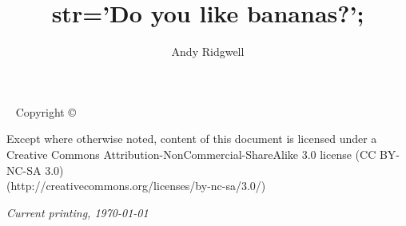 \documentclass{tufte-book} %
\title{str='Do you like bananas?';} %
\author{Andy Ridgwell} %
\begin{document}
\frontmatter


\maketitle %


\newpage
\begin{fullwidth}
~\vfill
\thispagestyle{empty}
\setlength{\parindent}{0pt}
\setlength{\parskip}{\baselineskip}
Copyright \copyright\ \the\year\ \thanklessauthor

\par{}

\par Except where otherwise noted, content of this document is licensed under a 
\\Creative Commons Attribution-NonCommercial-ShareAlike 3.0 license (CC BY-NC-SA 3.0) 
\\(http://creativecommons.org/licenses/by-nc-sa/3.0/)

\par\textit{Current printing, \today}
\end{fullwidth}


\tableofcontents %

\setcounter{chapter}{0}%


\listoffigures %


\listoftables %

\end{document}
